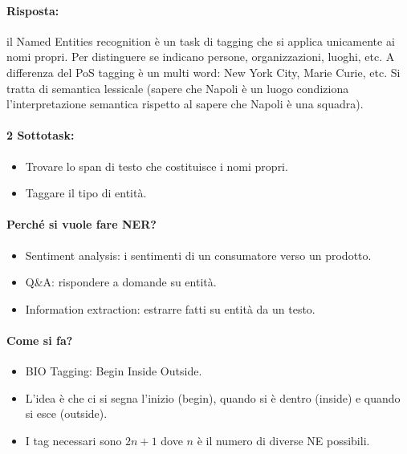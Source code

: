 
\paragraph{Risposta:} il Named Entities recognition è un task di tagging che si applica unicamente ai nomi propri. Per distinguere se indicano persone, organizzazioni, luoghi, etc. A differenza del PoS tagging è un multi word: New York City, Marie Curie, etc. Si tratta di semantica lessicale (sapere che Napoli è un luogo condiziona l'interpretazione semantica rispetto al sapere che Napoli è una squadra). 

\paragraph{2 Sottotask:}

\begin{itemize}
  \item Trovare lo span di testo che costituisce i nomi propri. 
  \item Taggare il tipo di entità.
\end{itemize}

\paragraph{Perché si vuole fare NER?}

\begin{itemize}
  \item Sentiment analysis: i sentimenti di un consumatore verso un prodotto. 
  \item Q\&A: rispondere a domande su entità. 
  \item Information extraction: estrarre fatti su entità da un testo.
\end{itemize}

\paragraph{Come si fa?}

\begin{itemize}
  \item BIO Tagging: Begin Inside Outside.
  \item L'idea è che ci si segna l'inizio (begin), quando si è dentro (inside) e quando si esce (outside).
  \item I tag necessari sono $2n + 1$ dove $n$ è il numero di diverse NE possibili.
\end{itemize}

